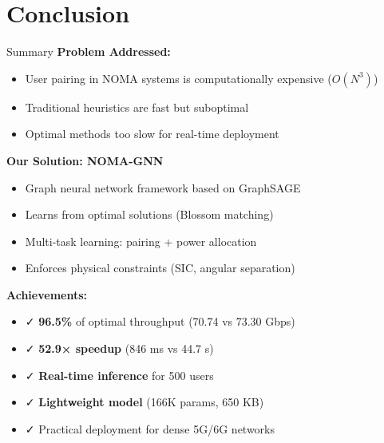 \documentclass[aspectratio=169]{beamer}
\begin{document}
\section{Conclusion}

\begin{frame}{Summary}
    \textbf{Problem Addressed:}
    \begin{itemize}
        \item User pairing in NOMA systems is computationally expensive ($O(N^3)$)
        \item Traditional heuristics are fast but suboptimal
        \item Optimal methods too slow for real-time deployment
    \end{itemize}
    
    \vspace{0.3cm}
    
    \textbf{Our Solution: NOMA-GNN}
    \begin{itemize}
        \item Graph neural network framework based on GraphSAGE
        \item Learns from optimal solutions (Blossom matching)
        \item Multi-task learning: pairing + power allocation
        \item Enforces physical constraints (SIC, angular separation)
    \end{itemize}
    
    \vspace{0.3cm}
    
    \textbf{Achievements:}
    \begin{itemize}
        \item ✓ \textbf{96.5\%} of optimal throughput (70.74 vs 73.30 Gbps)
        \item ✓ \textbf{52.9× speedup} (846 ms vs 44.7 s)
        \item ✓ \textbf{Real-time inference} for 500 users
        \item ✓ \textbf{Lightweight model} (166K params, 650 KB)
        \item ✓ Practical deployment for dense 5G/6G networks
    \end{itemize}
\end{frame}
\end{document}
